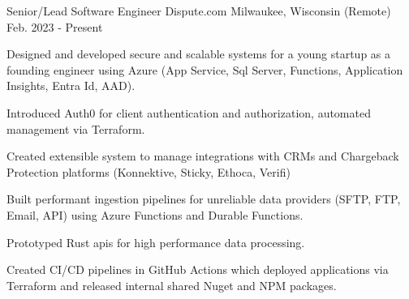 

\begin{cventries}

  \cventry
    {Senior/Lead Software Engineer} %
    {Dispute.com} %
    {Milwaukee, Wisconsin (Remote)} %
    {Feb. 2023 - Present} %
    {
      \begin{cvitems} %
        \item {Designed and developed secure and scalable systems for a young startup as a founding engineer using Azure (App Service, Sql Server, Functions, Application Insights, Entra Id, AAD).}
        \item {Introduced Auth0 for client authentication and authorization, automated management via Terraform.}
        \item {Created extensible system to manage integrations with CRMs and Chargeback Protection platforms (Konnektive, Sticky, Ethoca, Verifi)}
        \item {Built performant ingestion pipelines for unreliable data providers (SFTP, FTP, Email, API) using Azure Functions and Durable Functions.}
        \item {Prototyped Rust apis for high performance data processing.}
        \item {Created CI/CD pipelines in GitHub Actions which deployed applications via Terraform and released internal shared Nuget and NPM packages.}
      \end{cvitems}
    }


\end{cventries}

